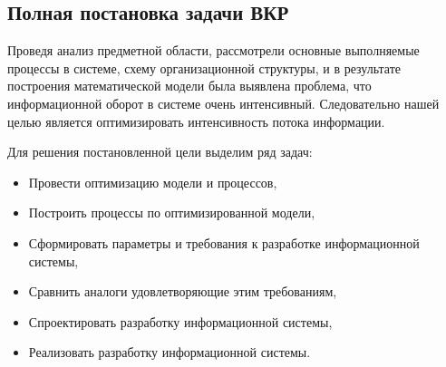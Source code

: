 \subsection{Полная постановка задачи ВКР}
Проведя анализ предметной области, рассмотрели основные выполняемые процессы в системе, схему организационной структуры, и в результате построения математической модели была выявлена проблема, что информационной оборот в системе очень интенсивный. Следовательно нашей целью является оптимизировать интенсивность потока информации.

Для решения постановленной цели выделим ряд задач:
\begin{itemize}
	\item Провести оптимизацию модели и процессов,
	\item Построить процессы по оптимизированной модели,
	\item Сформировать параметры и требования к разработке информационной системы,
	\item Сравнить аналоги удовлетворяющие этим требованиям,
	\item Спроектировать разработку информационной системы,
	\item Реализовать разработку информационной системы.
\end{itemize}
\pagebreak